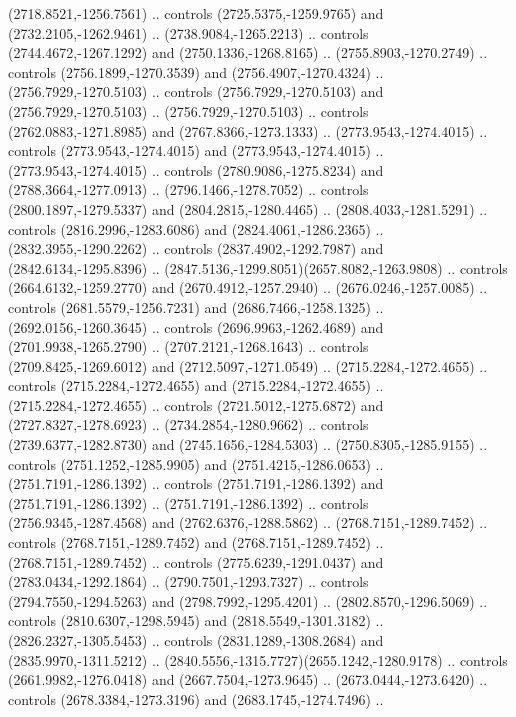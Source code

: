 \begin{scope}[shift={(28.3138,-376.6591)}]
\begin{scope}[shift={(-2186.6262,1813.8454)}]
      (2718.8521,-1256.7561) .. controls (2725.5375,-1259.9765) and
      (2732.2105,-1262.9461) .. (2738.9084,-1265.2213) .. controls
      (2744.4672,-1267.1292) and (2750.1336,-1268.8165) .. (2755.8903,-1270.2749) ..
      controls (2756.1899,-1270.3539) and (2756.4907,-1270.4324) ..
      (2756.7929,-1270.5103) .. controls (2756.7929,-1270.5103) and
      (2756.7929,-1270.5103) .. (2756.7929,-1270.5103) .. controls
      (2762.0883,-1271.8985) and (2767.8366,-1273.1333) .. (2773.9543,-1274.4015) ..
      controls (2773.9543,-1274.4015) and (2773.9543,-1274.4015) ..
      (2773.9543,-1274.4015) .. controls (2780.9086,-1275.8234) and
      (2788.3664,-1277.0913) .. (2796.1466,-1278.7052) .. controls
      (2800.1897,-1279.5337) and (2804.2815,-1280.4465) .. (2808.4033,-1281.5291) ..
      controls (2816.2996,-1283.6086) and (2824.4061,-1286.2365) ..
      (2832.3955,-1290.2262) .. controls (2837.4902,-1292.7987) and
      (2842.6134,-1295.8396) .. (2847.5136,-1299.8051)(2657.8082,-1263.9808) ..
      controls (2664.6132,-1259.2770) and (2670.4912,-1257.2940) ..
      (2676.0246,-1257.0085) .. controls (2681.5579,-1256.7231) and
      (2686.7466,-1258.1325) .. (2692.0156,-1260.3645) .. controls
      (2696.9963,-1262.4689) and (2701.9938,-1265.2790) .. (2707.2121,-1268.1643) ..
      controls (2709.8425,-1269.6012) and (2712.5097,-1271.0549) ..
      (2715.2284,-1272.4655) .. controls (2715.2284,-1272.4655) and
      (2715.2284,-1272.4655) .. (2715.2284,-1272.4655) .. controls
      (2721.5012,-1275.6872) and (2727.8327,-1278.6923) .. (2734.2854,-1280.9662) ..
      controls (2739.6377,-1282.8730) and (2745.1656,-1284.5303) ..
      (2750.8305,-1285.9155) .. controls (2751.1252,-1285.9905) and
      (2751.4215,-1286.0653) .. (2751.7191,-1286.1392) .. controls
      (2751.7191,-1286.1392) and (2751.7191,-1286.1392) .. (2751.7191,-1286.1392) ..
      controls (2756.9345,-1287.4568) and (2762.6376,-1288.5862) ..
      (2768.7151,-1289.7452) .. controls (2768.7151,-1289.7452) and
      (2768.7151,-1289.7452) .. (2768.7151,-1289.7452) .. controls
      (2775.6239,-1291.0437) and (2783.0434,-1292.1864) .. (2790.7501,-1293.7327) ..
      controls (2794.7550,-1294.5263) and (2798.7992,-1295.4201) ..
      (2802.8570,-1296.5069) .. controls (2810.6307,-1298.5945) and
      (2818.5549,-1301.3182) .. (2826.2327,-1305.5453) .. controls
      (2831.1289,-1308.2684) and (2835.9970,-1311.5212) ..
      (2840.5556,-1315.7727)(2655.1242,-1280.9178) .. controls
      (2661.9982,-1276.0418) and (2667.7504,-1273.9645) .. (2673.0444,-1273.6420) ..
      controls (2678.3384,-1273.3196) and (2683.1745,-1274.7496) ..

\end{scope}
\end{scope}
